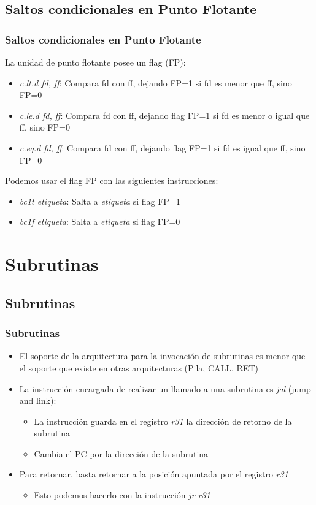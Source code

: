 \documentclass{beamer}
\begin{document}
\subsection{Saltos condicionales en Punto Flotante}

\begin{frame}
\frametitle{Saltos condicionales en Punto Flotante}
La unidad de punto flotante posee un flag (FP):
\begin{itemize}
\item \emph{c.lt.d fd, ff}: Compara fd con ff, dejando FP=1 si fd es menor que ff, sino FP=0
\item \emph{c.le.d fd, ff}: Compara fd con ff, dejando flag FP=1 si fd es menor o igual que ff, sino FP=0
\item \emph{c.eq.d fd, ff}: Compara fd con ff, dejando flag FP=1 si fd es igual que ff, sino FP=0
\end{itemize}

Podemos usar el flag FP con las siguientes instrucciones:
\begin{itemize}
\item \emph{bc1t etiqueta}: Salta a \emph{etiqueta} si flag FP=1 
\item \emph{bc1f etiqueta}: Salta a \emph{etiqueta} si flag FP=0
\end{itemize}
\end{frame}


\section{Subrutinas}
\subsection{Subrutinas}
\begin{frame}
\frametitle{Subrutinas}
\begin{itemize}
\item El soporte de la arquitectura para la invocación de subrutinas es menor que el soporte que existe en otras arquitecturas (Pila, CALL, RET)
\item La instrucción encargada de realizar un llamado a una subrutina es \emph{jal} (jump and link):
\begin{itemize}
\item La instrucción guarda en el registro \emph{r31} la dirección de retorno de la subrutina
\item Cambia el PC por la dirección de la subrutina
\end{itemize}
\item Para retornar, basta retornar a la posición apuntada por el registro \emph{r31}
\begin{itemize}
\item Esto podemos hacerlo con la instrucción \emph{jr r31}
\end{itemize}
\end{itemize}
\end{frame}
\end{document}
